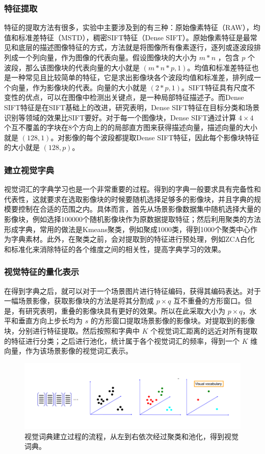 \documentclass{article}
\begin{document}
\subsubsection{特征提取}
特征的提取方法有很多，实验中主要涉及到的有三种：原始像素特征（RAW），均值和标准差特征（MSTD），稠密SIFT特征（Dense SIFT）。原始像素特征是最常见和底层的描述图像特征的方式，方法就是将图像所有像素逐行，逐列或逐波段排列成一个列向量，作为图像的代表向量。假设图像块的大小为 $m * n$ ，包含 $p$ 个波段，那么该图像块的代表向量的大小就是 $(m * n * p, 1)$。均值和标准差特征也是一种常见且比较简单的特征，它是求出影像块各个波段均值和标准差，排列成一个向量，作为影像块的代表。向量的大小就是 $(2 * p, 1)$。SIFT特征具有尺度不变性的优点，可以在图像中检测出关键点，是一种局部特征描述子。而Dense SIFT特征是在SIFT基础上的改进，研究表明，Dense SIFT特征在目标分类和场景识别等领域的效果比SIFT要好。对于每一个图像块，Dense SIFT通过计算 $4\times 4$ 个互不覆盖的字块在8个方向上的的局部直方图来获得描述向量，描述向量的大小就是 $(128, 1)$。对影像的每个波段都提取Dense SIFT特征，因此每个影像块特征的大小就是 $(128, p)$。

\subsubsection{建立视觉字典}
视觉词汇的字典学习也是一个非常重要的过程。得到的字典一般要求具有完备性和代表性，这就要求在选取影像块的时候要随机选择足够多的影像块，并且字典的规模要控制在合适的范围之内。具体而言，首先从场景影像数据集中随机选择大量的影像块，例如选择100000个随机影像块作为原数据提取特征；然后利用聚类的方法形成字典，常用的做法是Kmeans聚类，例如聚成1000类，得到1000个聚类中心作为字典素材。此外，在聚类之前，会对提取到的特征进行预处理，例如ZCA白化和标准化来消除特征的各个维度之间的相关性，提高字典学习的效果。

\subsubsection{视觉特征的量化表示}
在得到字典之后，就可以对于一个场景图片进行特征编码，获得其编码表达。对于一幅场景影像，获取影像块的方法是将其分割成 $p \times q$ 互不重叠的方形窗口。但是，有研究表明，重叠的影像块具有更好的效果。所以在此采取大小为 $p \times q$，水平和垂直方向上步长均为 $s$ 的方形窗口提取场景影像的影像块。对提取到的影像块，分别进行特征提取。然后按照和字典中 $K$ 个视觉词汇距离的远近对所有提取的特征进行分类；之后进行池化，统计属于各个视觉词汇的频率，得到一个 $K$ 维向量，作为该场景影像的视觉词汇表示。

\begin{figure}[h]
    \centering
    \includegraphics[width=\textwidth]{./project3/bow-step.png}
    \caption{视觉词典建立过程的流程，从左到右依次经过聚类和池化，得到视觉词典。}
\end{figure}
\end{document}
